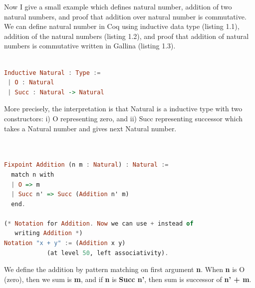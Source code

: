 Now I give a small example which defines natural number, addition of two natural numbers, and 
proof that addition over natural number is commutative.   We can define 
natural number in Coq using inductive data type (listing 1.1), addition of the natural numbers 
(listing 1.2), and proof that addition of natural numbers is commutative written in Gallina (listing 1.3).

\begin{lstlisting}[language=haskell, numbers=none, basicstyle=\ttfamily, 
caption=Inductive Data Type for Natural Numbers,  captionpos=b, xleftmargin=.1\textwidth]

Inductive Natural : Type :=
 | O : Natural
 | Succ : Natural -> Natural

\end{lstlisting}

More precisely, the interpretation is that Natural is a inductive type with two constructors: i) O representing zero,
and ii) Succ representing successor which takes a Natural number and gives next Natural number.

\begin{lstlisting}[language=haskell, numbers=none, basicstyle=\ttfamily,  caption=Addition function for Natural Numbers,  captionpos=b, xleftmargin=.1\textwidth]

 
Fixpoint Addition (n m : Natural) : Natural :=
  match n with
  | O => m
  | Succ n' => Succ (Addition n' m)
  end.

(* Notation for Addition. Now we can use + instead of 
   writing Addition *)
Notation "x + y" := (Addition x y)
            (at level 50, left associativity).
\end{lstlisting}

We define the addition by pattern matching on first argument \textbf{n}. When \textbf{n} is 
O (zero), then we sum is \textbf{m}, and if \textbf{n} is \textbf{Succ n'}, then sum is successor of 
\textbf{n' +  m}.

